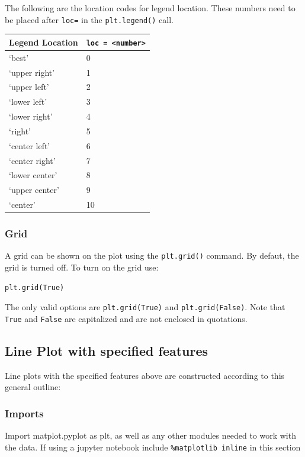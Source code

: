 \documentclass{book}
\begin{document}
The following are the location codes for legend location. These numbers
need to be placed after \lstinline!loc=! in the \lstinline!plt.legend()!
call.

\begin{longtable}[]{@{}ll@{}}
\toprule
Legend Location & \lstinline!loc = <number>!\tabularnewline
\midrule
\endhead
`best' & 0\tabularnewline
`upper right' & 1\tabularnewline
`upper left' & 2\tabularnewline
`lower left' & 3\tabularnewline
`lower right' & 4\tabularnewline
`right' & 5\tabularnewline
`center left' & 6\tabularnewline
`center right' & 7\tabularnewline
`lower center' & 8\tabularnewline
`upper center' & 9\tabularnewline
`center' & 10\tabularnewline
\bottomrule
\end{longtable}
    




    
        \subsubsection{Grid}\label{grid}

A grid can be shown on the plot using the \lstinline!plt.grid()!
command. By defaut, the grid is turned off. To turn on the grid use:

\begin{lstlisting}
plt.grid(True)
\end{lstlisting}

The only valid options are \lstinline!plt.grid(True)! and
\lstinline!plt.grid(False)!. Note that \lstinline!True! and
\lstinline!False! are capitalized and are not enclosed in quotations.
    




    
        \subsection{Line Plot with specified
features}\label{line-plot-with-specified-features}
    




    
        Line plots with the specified features above are constructed according
to this general outline:

\subsubsection{Imports}\label{imports}

Import matplot.pyplot as plt, as well as any other modules needed to
work with the data. If using a jupyter notebook include
\lstinline!%matplotlib inline! in this section
\end{document}
